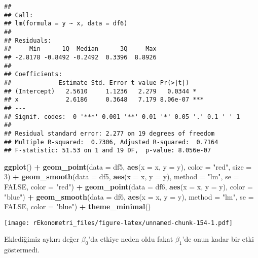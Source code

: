 \documentclass[
]{book}
\newenvironment{Shaded}{\begin{snugshade}}{\end{snugshade}}
\newcommand{\DataTypeTok}[1]{\textcolor[rgb]{0.13,0.29,0.53}{#1}}
\newcommand{\DecValTok}[1]{\textcolor[rgb]{0.00,0.00,0.81}{#1}}
\newcommand{\KeywordTok}[1]{\textcolor[rgb]{0.13,0.29,0.53}{\textbf{#1}}}
\newcommand{\NormalTok}[1]{#1}
\newcommand{\OperatorTok}[1]{\textcolor[rgb]{0.81,0.36,0.00}{\textbf{#1}}}
\newcommand{\OtherTok}[1]{\textcolor[rgb]{0.56,0.35,0.01}{#1}}
\newcommand{\StringTok}[1]{\textcolor[rgb]{0.31,0.60,0.02}{#1}}
\begin{document}
\begin{verbatim}
## 
## Call:
## lm(formula = y ~ x, data = df6)
## 
## Residuals:
##     Min      1Q  Median      3Q     Max 
## -2.8178 -0.8492 -0.2492  0.3396  8.8926 
## 
## Coefficients:
##             Estimate Std. Error t value Pr(>|t|)    
## (Intercept)   2.5610     1.1236   2.279   0.0344 *  
## x             2.6186     0.3648   7.179 8.06e-07 ***
## ---
## Signif. codes:  0 '***' 0.001 '**' 0.01 '*' 0.05 '.' 0.1 ' ' 1
## 
## Residual standard error: 2.277 on 19 degrees of freedom
## Multiple R-squared:  0.7306, Adjusted R-squared:  0.7164 
## F-statistic: 51.53 on 1 and 19 DF,  p-value: 8.056e-07
\end{verbatim}

\begin{Shaded}
\begin{Highlighting}[]
\KeywordTok{ggplot}\NormalTok{() }\OperatorTok{+}
\StringTok{  }\KeywordTok{geom_point}\NormalTok{(}\DataTypeTok{data =}\NormalTok{ df5, }\KeywordTok{aes}\NormalTok{(}\DataTypeTok{x =}\NormalTok{ x, }\DataTypeTok{y =}\NormalTok{ y), }\DataTypeTok{color =} \StringTok{"red"}\NormalTok{, }\DataTypeTok{size =} \DecValTok{3}\NormalTok{) }\OperatorTok{+}
\StringTok{  }\KeywordTok{geom_smooth}\NormalTok{(}\DataTypeTok{data =}\NormalTok{ df5, }\KeywordTok{aes}\NormalTok{(}\DataTypeTok{x =}\NormalTok{ x, }\DataTypeTok{y =}\NormalTok{ y), }\DataTypeTok{method =} \StringTok{"lm"}\NormalTok{, }\DataTypeTok{se =} \OtherTok{FALSE}\NormalTok{, }\DataTypeTok{color =} \StringTok{"red"}\NormalTok{) }\OperatorTok{+}
\StringTok{  }\KeywordTok{geom_point}\NormalTok{(}\DataTypeTok{data =}\NormalTok{ df6, }\KeywordTok{aes}\NormalTok{(}\DataTypeTok{x =}\NormalTok{ x, }\DataTypeTok{y =}\NormalTok{ y), }\DataTypeTok{color =} \StringTok{"blue"}\NormalTok{) }\OperatorTok{+}
\StringTok{  }\KeywordTok{geom_smooth}\NormalTok{(}\DataTypeTok{data =}\NormalTok{ df6, }\KeywordTok{aes}\NormalTok{(}\DataTypeTok{x =}\NormalTok{ x, }\DataTypeTok{y =}\NormalTok{ y), }\DataTypeTok{method =} \StringTok{"lm"}\NormalTok{, }\DataTypeTok{se =} \OtherTok{FALSE}\NormalTok{, }\DataTypeTok{color =} \StringTok{"blue"}\NormalTok{) }\OperatorTok{+}
\StringTok{  }\KeywordTok{theme_minimal}\NormalTok{()}
\end{Highlighting}
\end{Shaded}

\texttt{[image: rEkonometri\_files/figure-latex/unnamed-chunk-154-1.pdf]}

Eklediğimiz aykırı değer \(β_0\)'da etkiye neden oldu fakat \(β_1\)'de onun kadar bir etki göstermedi.
\end{document}
